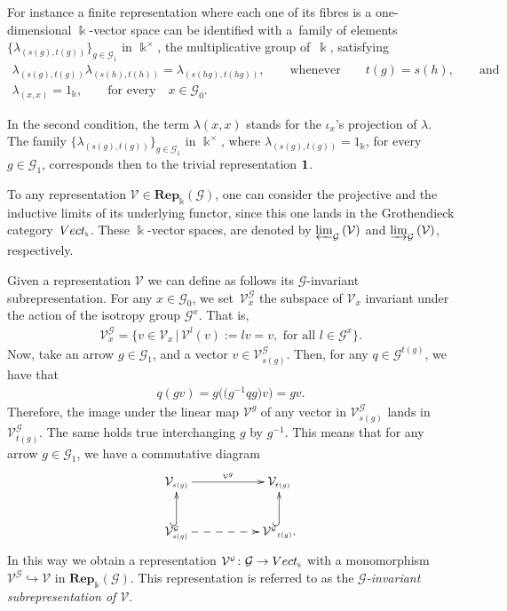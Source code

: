\documentclass[11pt]{article}
\numberwithin{equation}{section}
\newcommand{\Rep}[1]{\mathbf{Rep}_{\Sscript{\Bbbk}}(#1)}
\newcommand{\Vect}{{\rm Vect}_{\Sscript{\Bbbk}}}
\newcommand{\Go}{\cG_{\Sscript{0}}}
\newcommand{\Ga}{\cG_{\Sscript{1}}}
\newcommand{\Vx}{\cV_{\Sscript{x}}}
\newcommand{\cG}{{\mathcal G}}
\newcommand{\cV}{{\mathcal V}}
\newcommand{\Sscript}[1]{\scriptscriptstyle{#1}}
\newcommand{\prolimit}[2]{\varprojlim_{#1}\left({#2}\right)}
\newcommand{\injlimit}[2]{\varinjlim_{#1}\left({#2}\right)}
\newcommand{\Vgx}{\cV^{\Sscript{\cG}}_{\Sscript{x}}}
\newcommand{\Vgsg}{\cV^{\Sscript{\cG}}_{\Sscript{s(g)}}}
\newcommand{\Vgtg}{\cV^{\Sscript{\cG}}_{\Sscript{t(g)}}}
\begin{document}
\begin{Example}\label{exam:One}For instance a finite representation where each one of its fibres is a one-dimen\-sio\-nal $\Bbbk$-vector space can be identified with a~family of elements $\{ \lambda_{\Sscript{(s(g), t(g))}}\}_{\Sscript{ g \in \Ga}}$ in $\Bbbk^{\Sscript{\times}}$, the multiplicative group of~$\Bbbk$,
satisfying
\begin{gather*}
\lambda_{(s(g), t(g))} \lambda_{(s(h), t(h))} = \lambda_{(s(hg), t(hg))}, \qquad \text{whenever} \qquad t(g)=s(h), \qquad \text{and} \\ \lambda_{(x, x)} = 1_{\Sscript{\Bbbk}}, \qquad \text{for every} \quad x \in \Go.
\end{gather*}

In the second condition, the term $\lambda{\Sscript{(x,x)}}$ stands for the $\iota_{\Sscript{x}}$'s projection of $\lambda$. The family \linebreak $\{ \lambda_{\Sscript{(s(g), t(g))}}\}_{\Sscript{ g \in \Ga}}$ in $\Bbbk^{\Sscript{\times}}$, where $\lambda_{\Sscript{(s(g), t(g))}}=1_{\Sscript{\Bbbk}}$, for every $g \in \Ga$, corresponds then to the trivial representation $\bf 1$.
\end{Example}

To any representation $\cV \in \Rep{\cG}$, one can consider the projective and the inductive limits of its underlying functor, since this one lands in the Grothendieck category~$\Vect$. These $\Bbbk$-vector spaces, are denoted by $\prolimit{\cG}{\cV}$ and $\injlimit{\cG}{\cV}$, respectively.

Given a representation $\cV$ we can define as follows its $\cG$-invariant subrepresentation. For any $x \in \Go$, we set~$\Vgx$ the subspace of $\Vx$ invariant under the action of the isotropy group $\cG^{\Sscript{x}}$. That is,
\begin{gather*}
\Vgx=\big\{ v \in \Vx\,|\, \cV^{\Sscript{l}}(v):= l v=v, \text{ for all } l \in \cG^{\Sscript{x}} \big\}.
\end{gather*}
Now, take an arrow $g \in \Ga$, and a vector $v \in \Vgsg$. Then, for any $q \in \cG^{\Sscript{t(g)}}$, we have that
\begin{gather*}
q ( g v) = g \big( \big(g^{-1}q g\big) v \big) = g v.
\end{gather*}
Therefore, the image under the linear map $\cV^{\Sscript{g}}$ of any vector in $ \Vgsg$ lands in $ \Vgtg$. The same holds true interchanging $g$ by $g^{-1}$. This means that for any arrow $g \in
\Ga$, we have a commutative diagram
\begin{gather*}
\xymatrix{ \cV_{\Sscript{s(g)}}\ar@{->}^-{\Sscript{\cV^{\Sscript{g}}}}[rr] && \cV_{\Sscript{t(g)}}\\ \cV^{\Sscript{\cG}}_{\Sscript{s(g)}} \ar@{-->}^-{}[rr]
\ar@{^(->}^-{}[u] & & \cV^{\Sscript{\cG}}{}_{\Sscript{t(g)}}.\ar@{^(->}^-{}[u] }
\end{gather*}
In this way we obtain a representation $\cV^{\Sscript{\cG}}\colon \cG \to \Vect$ with a monomorphism $\cV^{\Sscript{\cG}} \hookrightarrow\cV$ in $\Rep{\cG}$. This representation is referred to as the \emph{$\cG$-invariant subrepresentation of $\cV$}.
\end{document}
